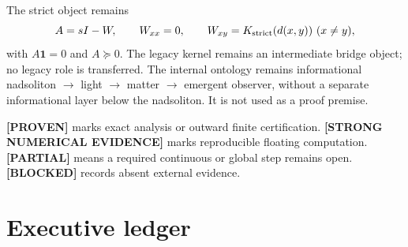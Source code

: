 \documentclass[11pt,a4paper]{article}
\newcommand{\Proven}{\textcolor{proved}{\textbf{[PROVEN]}}}\newcommand{\Evidence}{\textcolor{conditional}{\textbf{[STRONG NUMERICAL EVIDENCE]}}}\newcommand{\Partial}{\textcolor{conditional}{\textbf{[PARTIAL]}}}\newcommand{\Blocked}{\textcolor{blocked}{\textbf{[BLOCKED]}}}
\begin{document}
The strict object remains
\[
A=sI-W,\qquad W_{xx}=0,\qquad W_{xy}=K_{\rm strict}(d(x,y))\ (x\ne y),
\]
with $A\mathbf1=0$ and $A\succeq0$. The legacy kernel remains an intermediate bridge
object; no legacy role is transferred. The internal ontology remains informational
nadsoliton $\to$ light $\to$ matter $\to$ emergent observer, without a separate
informational layer below the nadsoliton. It is not used as a proof premise.

\Proven{} marks exact analysis or outward finite certification. \Evidence{} marks
reproducible floating computation. \Partial{} means a required continuous or global step
remains open. \Blocked{} records absent external evidence.

\section{Executive ledger}
\small
\end{document}
